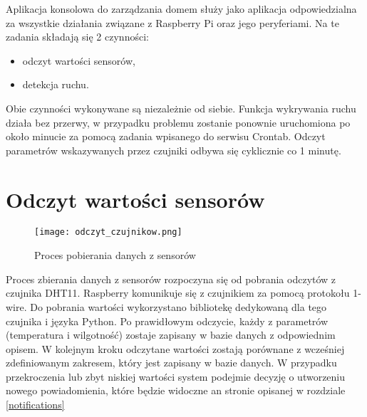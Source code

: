 Aplikacja konsolowa do zarządzania domem służy jako aplikacja odpowiedzialna za wszystkie działania związane z Raspberry Pi oraz jego peryferiami. Na te zadania składają się 2 czynności:
\begin{itemize}
\item odczyt wartości sensorów,
\item detekcja ruchu.
\end{itemize}
Obie czynności wykonywane są niezależnie od siebie. Funkcja wykrywania ruchu działa bez przerwy, w przypadku problemu zostanie ponownie uruchomiona po około minucie za pomocą zadania wpisanego do serwisu Crontab. Odczyt parametrów wskazywanych przez czujniki odbywa się cyklicznie co 1 minutę.

\section{Odczyt wartości sensorów}
\begin{figure}[H]
	\centering
	\texttt{[image: odczyt\_czujnikow.png]}
	\caption{Proces pobierania danych z sensorów}
	\label{fig:wykrywanie_proces}
\end{figure}
Proces zbierania danych z sensorów rozpoczyna się od pobrania odczytów z czujnika DHT11. Raspberry komunikuje się z czujnikiem za pomocą protokołu 1-wire. Do pobrania wartości wykorzystano bibliotekę dedykowaną dla tego czujnika i języka Python. Po prawidłowym odczycie, każdy z parametrów (temperatura i wilgotność) zostaje zapisany w bazie danych z odpowiednim opisem. W kolejnym kroku odczytane wartości zostają porównane z wcześniej zdefiniowanym zakresem, który jest zapisany w bazie danych. W przypadku przekroczenia lub zbyt niskiej wartości system podejmie decyzję o utworzeniu nowego powiadomienia, które będzie widoczne an stronie opisanej w rozdziale \ref{notifications}

